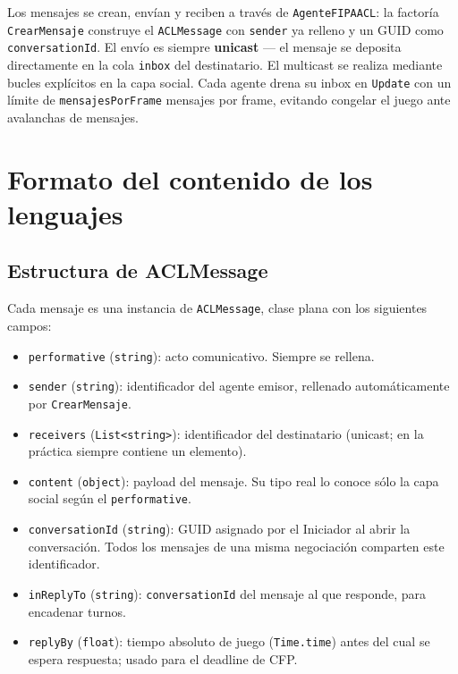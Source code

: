 \documentclass[a4paper,12pt]{article}
\begin{document}
Los mensajes se crean, envían y reciben a través de \texttt{AgenteFIPAACL}: la factoría \texttt{CrearMensaje} construye el \texttt{ACLMessage} con \texttt{sender} ya relleno y un GUID como \texttt{conversationId}. El envío es siempre \textbf{unicast} — el mensaje se deposita directamente en la cola \texttt{inbox} del destinatario. El multicast se realiza mediante bucles explícitos en la capa social. Cada agente drena su inbox en \texttt{Update} con un límite de \texttt{mensajesPorFrame} mensajes por frame, evitando congelar el juego ante avalanchas de mensajes.


\section{Formato del contenido de los lenguajes}

\subsection*{Estructura de ACLMessage}

Cada mensaje es una instancia de \texttt{ACLMessage}, clase plana con los siguientes campos:

\begin{itemize}
    \item \texttt{performative} (\texttt{string}): acto comunicativo. Siempre se rellena.
    \item \texttt{sender} (\texttt{string}): identificador del agente emisor, rellenado automáticamente por \texttt{CrearMensaje}.
    \item \texttt{receivers} (\texttt{List<string>}): identificador del destinatario (unicast; en la práctica siempre contiene un elemento).
    \item \texttt{content} (\texttt{object}): payload del mensaje. Su tipo real lo conoce sólo la capa social según el \texttt{performative}.
    \item \texttt{conversationId} (\texttt{string}): GUID asignado por el Iniciador al abrir la conversación. Todos los mensajes de una misma negociación comparten este identificador.
    \item \texttt{inReplyTo} (\texttt{string}): \texttt{conversationId} del mensaje al que responde, para encadenar turnos.
    \item \texttt{replyBy} (\texttt{float}): tiempo absoluto de juego (\texttt{Time.time}) antes del cual se espera respuesta; usado para el deadline de CFP.
\end{itemize}
\end{document}
